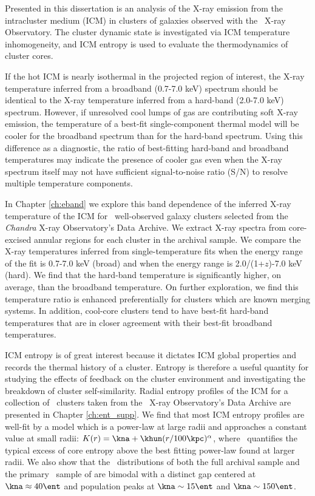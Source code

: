 Presented in this dissertation is an analysis of the X-ray emission
from the intracluster medium (ICM) in clusters of galaxies observed
with the \chandra\ X-ray Observatory. The cluster dynamic state is
investigated via ICM temperature inhomogeneity, and ICM entropy is
used to evaluate the thermodynamics of cluster cores.

If the hot ICM is nearly isothermal in the projected region of
interest, the X-ray temperature inferred from a broadband (0.7-7.0
keV) spectrum should be identical to the X-ray temperature inferred
from a hard-band (2.0-7.0 keV) spectrum. However, if unresolved cool
lumps of gas are contributing soft X-ray emission, the temperature of
a best-fit single-component thermal model will be cooler for the
broadband spectrum than for the hard-band spectrum. Using this
difference as a diagnostic, the ratio of best-fitting hard-band and
broadband temperatures may indicate the presence of cooler gas even
when the X-ray spectrum itself may not have sufficient signal-to-noise
ratio (S/N) to resolve multiple temperature components.

In Chapter \ref{ch:eband} we explore this band dependence of the
inferred X-ray temperature of the ICM for \ebandnuma\ well-observed
galaxy clusters selected from the {\it Chandra} X-ray Observatory's
Data Archive. We extract X-ray spectra from core-excised annular
regions for each cluster in the archival sample. We compare the X-ray
temperatures inferred from single-temperature fits when the energy
range of the fit is 0.7-7.0 keV (broad) and when the energy range is
2.0/(1+$z$)-7.0 keV (hard). We find that the hard-band temperature is
significantly higher, on average, than the broadband temperature. On
further exploration, we find this temperature ratio is enhanced
preferentially for clusters which are known merging systems. In
addition, cool-core clusters tend to have best-fit hard-band
temperatures that are in closer agreement with their best-fit
broadband temperatures.

ICM entropy is of great interest because it dictates ICM global
properties and records the thermal history of a cluster. Entropy is
therefore a useful quantity for studying the effects of feedback on
the cluster environment and investigating the breakdown of cluster
self-similarity. Radial entropy profiles of the ICM for a collection
of \entsuppnum\ clusters taken from the \chandra\ X-ray Observatory's
Data Archive are presented in Chapter \ref{ch:ent_supp}. We find that
most ICM entropy profiles are well-fit by a model which is a power-law
at large radii and approaches a constant value at small radii: $K(r) =
\kna + \khun (r/100 \kpc)^{\alpha}$, where \kna\ quantifies the
typical excess of core entropy above the best fitting power-law found
at larger radii. We also show that the \kna\ distributions of both the
full archival sample and the primary \hifl\ sample of
\citet{hiflugcs1} are bimodal with a distinct gap centered at $\kna
\approx 40 \ent$ and population peaks at $\kna \sim 15 \ent$ and $\kna
\sim 150 \ent$.

